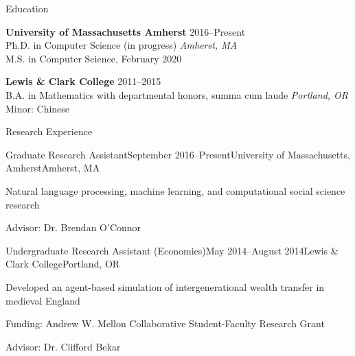\documentclass{resume} %
\begin{document}
%


\begin{rSection}{Education}

{\bf University of Massachusetts Amherst} \hfill {2016--Present} \\ 
Ph.D. in Computer Science (in progress) \hfill {\em Amherst, MA} \\
M.S. in Computer Science, February 2020
 

{\bf Lewis \& Clark College} \hfill {2011--2015} \\ 
B.A. in Mathematics with departmental honors, summa cum laude \hfill {\em Portland, OR} \\
Minor: Chinese \\
\end{rSection}


\begin{rSection}{Research Experience}

\begin{rSubsection}{Graduate Research Assistant}{September 2016--Present}{University of Massachusetts, Amherst}{Amherst, MA}
\item Natural language processing, machine learning, and computational social science research
\item Advisor: Dr. Brendan O'Connor 
\end{rSubsection}


\begin{rSubsection}{Undergraduate Research Assistant (Economics)}{May 2014--August 2014}{Lewis \& Clark College}{Portland, OR}
\item Developed an agent-based simulation of intergenerational wealth transfer in medieval England
\item Funding: Andrew W. Mellon Collaborative Student-Faculty Research Grant
\item Advisor: Dr. Clifford Bekar
\end{rSubsection}

\end{rSection}
\end{document}
